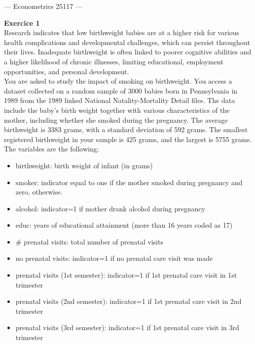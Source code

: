 \documentclass{article}
\begin{document}
\begin{center}
{\Large --- Econometrics 25117 --- }\bigskip 
\end{center}



\textbf{Exercice 1} \\[1em]

Research indicates that low birthweight babies are at a higher risk for various health complications and developmental challenges, which can persist throughout their lives. Inadequate birthweight is often linked to poorer cognitive abilities and a higher likelihood of chronic illnesses, limiting educational, employment opportunities, and personal development.\\

You are asked to study the impact of smoking on birthweight. You access a dataset collected on a random sample of 3000 babies born in Pennsylvania in 1989 from the 1989 linked National Natality-Mortality Detail files. The data include the baby’s birth weight together with various characteristics of the mother, including whether she smoked during the pregnancy. The average birthweight is 3383 grams, with a standard deviation of 592 grams. The smallest registered birthweight in your sample is 425 grams, and the largest is 5755 grams.\\

The variables are the following:
\begin{itemize}
    \item[-] birthweight: birth weight of infant (in grams)
    \item[-] smoker: indicator equal to one if the mother smoked during pregnancy and zero, otherwise.
    \item[-] alcohol: indicator=1 if mother drank alcohol during pregnancy
    \item[-] educ: years of educational attainment (more than 16 years coded as 17)
    \item[-] \# prenatal visits: total number of prenatal visits
    \item[-] no prenatal visits: indicator=1 if no prenatal care visit was made
    \item[-] prenatal visits (1st semester): indicator=1 if 1st prenatal care visit in 1st trimester
    \item[-] prenatal visits (2nd semester): indicator=1 if 1st prenatal care visit in 2nd trimester
    \item[-] prenatal visits (3rd semester): indicator=1 if 1st prenatal care visit in 3rd trimester
\end{itemize}
\end{document}
